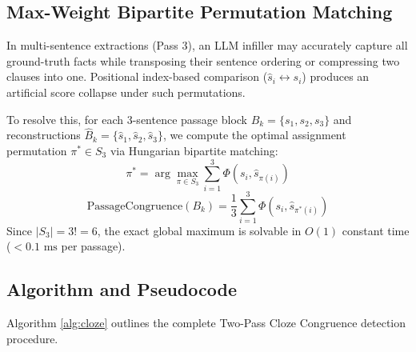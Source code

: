 \documentclass[conference]{IEEEtran}
\begin{document}
\subsection{Max-Weight Bipartite Permutation Matching}
In multi-sentence extractions (Pass 3), an LLM infiller may accurately capture all ground-truth facts while transposing their sentence ordering or compressing two clauses into one. Positional index-based comparison ($\hat{s}_i \leftrightarrow s_i$) produces an artificial score collapse under such permutations.

To resolve this, for each 3-sentence passage block $B_k = \{s_1, s_2, s_3\}$ and reconstructions $\hat{B}_k = \{\hat{s}_1, \hat{s}_2, \hat{s}_3\}$, we compute the optimal assignment permutation $\pi^* \in S_3$ via Hungarian bipartite matching:
\begin{equation}
\pi^* = \arg\max_{\pi \in S_3} \sum_{i=1}^3 \Phi\left(s_i, \hat{s}_{\pi(i)}\right)
\end{equation}
\begin{equation}
\text{PassageCongruence}(B_k) = \frac{1}{3} \sum_{i=1}^3 \Phi\left(s_i, \hat{s}_{\pi^*(i)}\right)
\end{equation}
Since $|S_3| = 3! = 6$, the exact global maximum is solvable in $O(1)$ constant time ($< 0.1\text{ ms}$ per passage).

\subsection{Algorithm and Pseudocode}
Algorithm \ref{alg:cloze} outlines the complete Two-Pass Cloze Congruence detection procedure.
\end{document}

